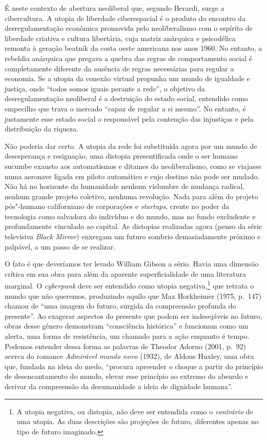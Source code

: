 É neste contexto de abertura neoliberal que,
segundo Berardi, surge a cibercultura. A utopia de liberdade
ciberespacial é o produto do encontro da desregulamentação econômica
promovida pelo neoliberalismo com o espírito de liberdade criativa e
cultura libertária, cuja matriz anárquica e psicodélica remonta à
geração beatnik da costa oeste americana nos anos 1960.
No entanto, a rebeldia anárquica que pregava a quebra das regras de
comportamento social é completamente diferente da ausência de regras
necessárias para regular a economia. Se a utopia da conexão virtual
propunha um mundo de igualdade e justiça, onde ``todos somos iguais
perante a rede'', o objetivo da desregulamentação neoliberal é a
destruição do estado social, entendido como empecilho que trava o
mercado ``capaz de regular a si mesmo''. No entanto, é justamente esse
estado social o responsável pela contenção das injustiças e pela
distribuição da riqueza.

Não poderia dar certo. A utopia da rede foi substituída agora por um
mundo de desesperança e resignação, uma distopia presentificada onde o
ser humano sucumbe exausto aos automatismos e ditames do neoliberalismo,
como se viajasse numa aeronave ligada em piloto automático e cujo
destino não pode ser mudado. Não há no horizonte da humanidade nenhum
vislumbre de mudança radical, nenhum grande projeto coletivo, nenhuma
revolução. Nada para além do projeto pós"-humano californiano de corporações e \emph{startups}, crente no poder da tecnologia como salvadora do indivíduo e do mundo, mas no fundo excludente e profundamente vinculado ao capital. As distopias realizadas agora (penso da série televisiva
\emph{Black Mirror}) enxergam um futuro sombrio demasiadamente próximo e
palpável, a um passo de se realizar.

O fato é que deveríamos ter levado William Gibson a sério. Havia uma dimensão crítica em sua obra para além da aparente superficialidade de uma literatura marginal. O \emph{cyberpunk} deve ser entendido como utopia negativa,\footnote{A utopia \label{utopianegativa}
negativa, ou distopia, não deve ser entendida como o \emph{contrário} de uma utopia. As duas descrições são projeções de futuro, diferentes apenas no tipo de futuro imaginado.} que retrata o mundo que não queremos, produzindo aquilo que Max Horkheimer (1975, p.~147) chamou de ``uma imagem do futuro, surgida da compreensão profunda do presente''. Ao exagerar aspectos do presente que podem ser indesejáveis no futuro, obras desse gênero demonstram ``consciência histórica'' e funcionam como um alerta, uma forma de resistência, um chamado para a ação enquanto é tempo. Podemos entender dessa forma as palavras de Theodor Adorno (2001, p.~92) acerca do romance \emph{Admirável mundo novo} (1932), de Aldous Huxley, uma obra que, fundada na ideia do medo, ``procura apreender o choque a partir do princípio de desencantamento do mundo, elevar esse princípio ao extremo do absurdo e derivar da compreensão da desumanidade a ideia de dignidade humana''.

